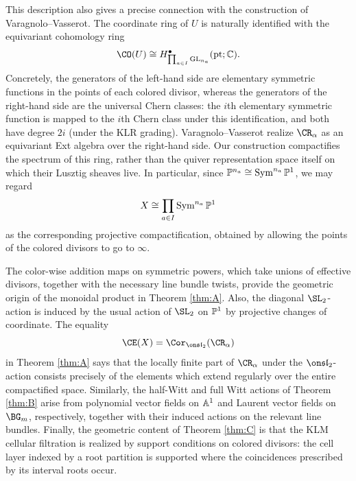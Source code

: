 \documentclass[11pt,reqno]{amsart}
\begin{document}
This description also gives a precise connection with the construction of Varagnolo--Vasserot. The coordinate ring of $U$ is naturally identified with the equivariant cohomology ring \[\CO(U)\cong H^\bullet_{\prod_{a\in I}\GL_{n_a}}(\text{pt}; \BC).\] Concretely, the generators of the left-hand side are elementary symmetric functions in the points of each colored divisor, whereas the generators of the right-hand side are the universal Chern classes: the $i$th elementary symmetric function is mapped to the $i$th Chern class under this identification, and both have degree $2i$ (under the KLR grading). Varagnolo--Vasserot \cite{varagnolo2011canonical} realize $\CR_\alpha$ as an equivariant Ext algebra over the right-hand side. Our construction compactifies the spectrum of this ring, rather than the quiver representation space itself on which their Lusztig sheaves live. In particular, since $\mathbb P^{n_a}\cong \operatorname{Sym}^{n_a}\mathbb P^1$, we may regard \[X\cong \prod_{a\in I}\operatorname{Sym}^{n_a}\mathbb P^1\] as the corresponding projective compactification, obtained by allowing the points of the colored divisors to go to $\infty$. 

The color-wise addition maps on symmetric powers, which take unions of
effective divisors, together with the necessary line bundle twists,
provide the geometric origin of the monoidal product in Theorem \ref{thm:A}. Also, the diagonal $\SL_2$-action
is induced by the usual action of $\SL_2$ on $\mathbb P^1$ by projective
changes of coordinate. The equality
\[
\CE(X)=\Cor_{\sl_2}(\CR_\alpha)
\]
in Theorem \ref{thm:A} says that the locally finite part of $\CR_\alpha$ under the $\sl_2$-action consists precisely of the elements which extend regularly over the entire compactified space. Similarly, the half-Witt and full Witt actions of
Theorem \ref{thm:B} arise from polynomial vector fields on $\mathbb A^1$ and Laurent vector fields on $\BG_m$, respectively, together with their induced actions on the relevant line bundles. Finally, the geometric content of Theorem \ref{thm:C} is that the KLM cellular filtration is realized by support conditions on colored divisors: the cell layer indexed by a root partition is supported where the coincidences prescribed by its interval roots occur.
\end{document}
